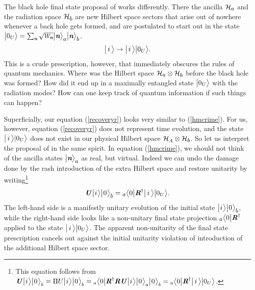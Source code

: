 \documentclass[12pt]{article}%
\def\spc{\hspace{.5pt}}
\def\be{\begin{equation}}
\def\ee{\end{equation}}
\begin{document}
The black hole final state proposal of \cite{finalstate} works differently. There the ancilla ${\cal H}_\aaaa$ and the radiation space ${\cal H}_\bbbb$  
are new Hilbert space sectors that arise out of nowhere whenever a back hole gets formed, and are postulated to start out in the state 
$\bigl|0_U\ra = \sum_\nom \sqrt{\pp_\nom} \bigl|\nom\ra_\aaaa \bigl|\nom\ra_\bbbb$. 
\be
\label{hmcrime}
\bigl| \, i \, \ra    \rightarrow \bigl| \, i \, \ra  \bigl|0_U\ra.
\ee
This is a crude prescription, however, that immediately obscures the rules of quantum mechanics. Where was 
the Hilbert space ${\cal H}_\aaaa \otimes {\cal H}_\bbbb$ before the black hole was formed?
How did it end up in a maximally entangled state $\bigl|0_U\bigr\rangle$ with the radiation modes? How can one keep track of quantum information if such things can happen?

Superficially, our equation (\ref{recoveryr}) looks very similar to (\ref{hmcrime}). For us, however, equation (\ref{recoveryr}) does not represent time evolution,
and the state  $\bigl| \, i \, \bigr\rangle  |0_U\bigr\rangle$ does not exist in our physical Hilbert space ${\cal H}_\AA \otimes {\cal H}_\bbbb$. 
So let us interpret the proposal of \cite{finalstate}
in the same spirit. In equation (\ref{hmcrime}), we should not think of the ancilla states $\bigl|\nom\ra_\aaaa$ as real, but virtual.  Indeed we  can undo the damage done by 
the rash introduction of the extra Hilbert space and restore unitarity by writing\footnote{This equation follows from $\uU \bigl| \spc i \spc \ra \bigl|\spc 0 \spc \ra_b = \Pi U  \bigl| \spc i \spc \ra \bigl|\spc 0 \spc \ra_b = 
{}_a\la 0 \bigr| \rR^\dag \rR \uU  \bigr| \spc i \spc \ra \bigl|\spc 0 \spc \ra_a \bigl|\spc 0 \spc \ra_b = {}_a\la 0 \bigl| \rR^\dag \bigr| \, i \, \ra  \bigl| 0_U \ra $.}
\be
\label{finproj}
\uU \bigl| \spc i \spc \ra \bigl|\spc 0 \spc \ra_\bbbb  = {}_\aaaa \la 0\bigl| \rR^\dag \bigl| \, i \, \ra  \bigl| 0_U \ra .
\ee
The left-hand side is a manifestly unitary evolution of the initial state $\bigl| \spc i \spc \ra \bigl|\spc 0 \spc \ra_\bbbb$, while the right-hand side looks like a non-unitary final
state projection ${}_\aaaa \la 0 \bigr| \rR^\dag$ applied to the state $\bigl| \, i \,  \bigr\rangle  \bigl|0_U\bigr\rangle$. The apparent non-unitarity of the final state prescription cancels out
against the initial unitarity violation of introduction of the additional Hilbert space sector. 
\end{document}
